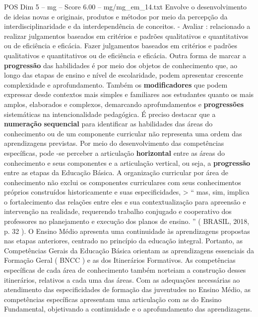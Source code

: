 \begin{textsample}{POS Dim 5 – mg – Score 6.00 – mg/mg\_em\_14.txt}
Envolve o desenvolvimento de ideias novas e originais, produtos e métodos por meio da percepção da interdisciplinaridade e da interdependência de conceitos. - Avaliar : relacionado a realizar julgamentos baseados em critérios e padrões qualitativos e quantitativos ou de eficiência e eficácia.
Fazer julgamentos baseados em critérios e padrões qualitativos e quantitativos ou de eficiência e eficácia.
Outra forma de marcar a \textbf{progressão} das habilidades é por meio dos objetos de conhecimento que, ao longo das etapas de ensino e nível de escolaridade, podem apresentar crescente complexidade e aprofundamento.
Também os \textbf{modificadores} que podem expressar desde contextos mais simples e familiares aos estudantes quanto os mais amplos, elaborados e complexos, demarcando aprofundamentos e \textbf{progressões} sistemáticas na intencionalidade pedagógica.
É preciso destacar que a \textbf{numeração} \textbf{sequencial} para identificar as habilidades das áreas do conhecimento ou de um componente curricular não representa uma ordem das aprendizagens previstas.
Por meio do desenvolvimento das competências específicas, pode -se perceber a articulação \textbf{horizontal} entre as áreas do conhecimento e seus componentes e a articulação vertical, ou seja, a \textbf{progressão} entre as etapas da Educação Básica.
A organização curricular por área de conhecimento não exclui os componentes curriculares com seus conhecimentos próprios construídos historicamente e suas especificidades, > “ mas, sim, implica o fortalecimento das relações entre eles e sua contextualização para apreensão e intervenção na realidade, requerendo trabalho conjugado e cooperativo dos professores no planejamento e execução dos planos de ensino. ” ( BRASIL, 2018, p. 32 ).
O Ensino Médio apresenta uma continuidade às aprendizagens propostas nas etapas anteriores, centrado no princípio da educação integral.
Portanto, as Competências Gerais da Educação Básica orientam as aprendizagens essenciais da Formação Geral ( BNCC ) e as dos Itinerários Formativos.
As competências específicas de cada área de conhecimento também norteiam a construção desses itinerários, relativos a cada uma das áreas.
Com as adequações necessárias ao atendimento das especificidades de formação das juventudes no Ensino Médio, as competências específicas apresentam uma articulação com as do Ensino Fundamental, objetivando a continuidade e o aprofundamento das aprendizagens.

\end{textsample}
